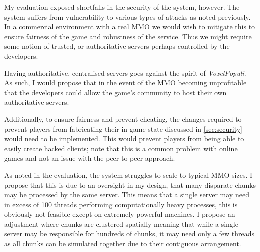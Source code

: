 \documentclass[10pt,twoside,notitlepage,a4paper]{report}
\newcommand{\voxpop}{\emph{VoxelPopuli}}
\begin{document}
	My evaluation exposed shortfalls in the security of the system, however. The system suffers from vulnerability to various types of attacks as noted previously. In a commercial environment with a real MMO we would wish to mitigate this to ensure fairness of the game and robustness of the service. Thus we might require some notion of trusted, or authoritative servers perhaps controlled by the developers.
	
	Having authoritative, centralised servers goes against the spirit of \voxpop{}. As such, I would propose that in the event of the MMO becoming unprofitable that the developers could allow the game's community to host their own authoritative servers.
	
	Additionally, to ensure fairness and prevent cheating, the changes required to prevent players from fabricating their in-game state discussed in \cref{sec:security} would need to be implemented. This would prevent players from being able to easily create hacked clients; note that this is a common problem with online games and not an issue with the peer-to-peer approach.
	
	As noted in the evaluation, the system struggles to scale to typical MMO sizes. I propose that this is due to an oversight in my design, that many disparate chunks may be processed by the same server. This means that a single server may need in excess of 100 threads performing computationally heavy processes, this is obviously not feasible except on extremely powerful machines. I propose an adjustment where chunks are clustered spatially meaning that while a single server may be responsible for hundreds of chunks, it may need only a few threads as all chunks can be simulated together due to their contiguous arrangement.
	
	\cleardoublepage
	
\end{document}
